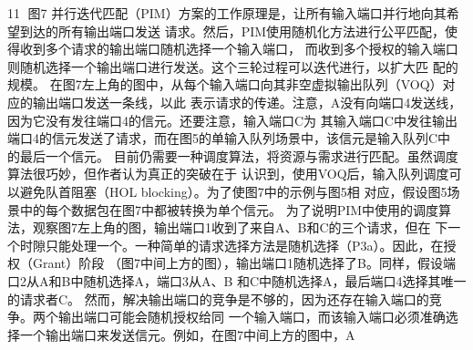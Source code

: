                                                                         11
图7 并行迭代匹配（PIM）方案的工作原理是，让所有输入端口并行地向其希望到达的所有输出端口发送
请求。然后，PIM使用随机化方法进行公平匹配，使得收到多个请求的输出端口随机选择一个输入端口，
而收到多个授权的输入端口则随机选择一个输出端口进行发送。这个三轮过程可以迭代进行，以扩大匹
配的规模。
在图7左上角的图中，从每个输入端口向其非空虚拟输出队列（VOQ）对应的输出端口发送一条线，以此
表示请求的传递。注意，A没有向端口4发送线，因为它没有发往端口4的信元。还要注意，输入端口C为
其输入端口C中发往输出端口4的信元发送了请求，而在图5的单输入队列场景中，该信元是输入队列C中
的最后一个信元。
目前仍需要一种调度算法，将资源与需求进行匹配。虽然调度算法很巧妙，但作者认为真正的突破在于
认识到，使用VOQ后，输入队列调度可以避免队首阻塞（HOL blocking）。为了使图7中的示例与图5相
对应，假设图5场景中的每个数据包在图7中都被转换为单个信元。
为了说明PIM中使用的调度算法，观察图7左上角的图，输出端口1收到了来自A、B和C的三个请求，但在
下一个时隙只能处理一个。一种简单的请求选择方法是随机选择（P3a）。因此，在授权（Grant）阶段
（图7中间上方的图），输出端口1随机选择了B。同样，假设端口2从A和B中随机选择A，端口3从A、B
和C中随机选择A，最后端口4选择其唯一的请求者C。
然而，解决输出端口的竞争是不够的，因为还存在输入端口的竞争。两个输出端口可能会随机授权给同
一个输入端口，而该输入端口必须准确选择一个输出端口来发送信元。例如，在图7中间上方的图中，A

